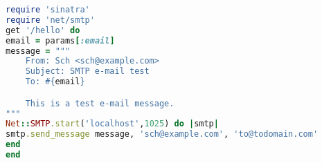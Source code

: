 \begin{lstlisting}[language=Ruby,caption={Ruby program with e-mail
      header injection vulnerability.},label={code:rubyemi}, float]
require 'sinatra'
require 'net/smtp'
get '/hello' do
email = params[:email]
message = """
    From: Sch <sch@example.com>
    Subject: SMTP e-mail test
    To: #{email}

    This is a test e-mail message.
"""
Net::SMTP.start('localhost',1025) do |smtp|
smtp.send_message message, 'sch@example.com', 'to@todomain.com'
end
end
\end{lstlisting}
